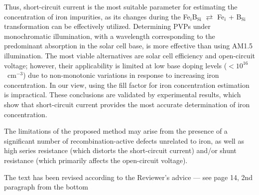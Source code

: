 \documentclass[a4paper,fleqn]{cas-sc}
\begin{document}
Thus, short-circuit current is the most suitable parameter for estimating the concentration of iron impurities, as its changes during the
Fe$_i$B$_\mathrm{Si}$ $\rightleftarrows$ Fe$_i$ + B$_\mathrm{Si}$ transformation can be effectively utilized.
Determining PVPs under monochromatic illumination,
with a wavelength corresponding to the predominant absorption in the solar cell base, is more effective than using AM1.5 illumination.
The most viable alternatives are solar cell efficiency and open-circuit voltage;
however, their applicability is limited at low base doping levels ($<10^{16}$~cm$^{-3}$)
due to non-monotonic variations in response to increasing iron concentration.
In our view, using the fill factor for iron concentration estimation is impractical.
These conclusions are validated by experimental results, which show that short-circuit current provides the most accurate determination of iron concentration.

The limitations of the proposed method may arise from the presence of a significant
number of recombination-active defects unrelated to iron,
as well as high series resistance (which distorts the short-circuit current) and/or shunt resistance (which primarily affects the open-circuit voltage).

The text has been revised according to the Reviewer's advice --- see page 14, 2nd paragraph from the bottom
\end{document}
